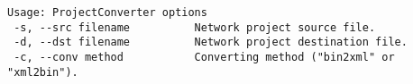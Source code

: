\begin{verbatim}
Usage: ProjectConverter options
 -s, --src filename          Network project source file.
 -d, --dst filename          Network project destination file.
 -c, --conv method           Converting method ("bin2xml" or "xml2bin").
\end{verbatim}
